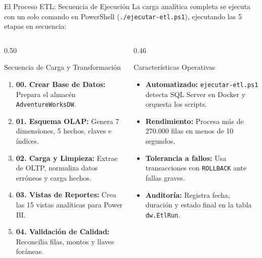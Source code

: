\documentclass[aspectratio=169, 10pt]{beamer}
\begin{document}
\begin{frame}{El Proceso ETL: Secuencia de Ejecución}
    La carga analítica completa se ejecuta con un solo comando en PowerShell (\texttt{./ejecutar-etl.ps1}), ejecutando las 5 etapas en secuencia:
    
    \vspace{0.2cm}
    \begin{columns}[t]
        \begin{column}{0.50\textwidth}
            \begin{block}{Secuencia de Carga y Transformación}
                \footnotesize
                \begin{enumerate}\setlength{\itemsep}{2.5pt}
                    \item \textbf{00. Crear Base de Datos:} Prepara el almacén \texttt{AdventureWorksDW}.
                    \item \textbf{01. Esquema OLAP:} Genera 7 dimensiones, 5 hechos, claves e índices.
                    \item \textbf{02. Carga y Limpieza:} Extrae de OLTP, normaliza datos erróneos y carga hechos.
                    \item \textbf{03. Vistas de Reportes:} Crea las 15 vistas analíticas para Power BI.
                    \item \textbf{04. Validación de Calidad:} Reconcilia filas, montos y llaves foráneas.
                \end{enumerate}
            \end{block}
        \end{column}
        
        \begin{column}{0.46\textwidth}
            \begin{exampleblock}{Características Operativas}
                \footnotesize
                \begin{itemize}\setlength{\itemsep}{2.5pt}
                    \item \textbf{Automatizado:} \texttt{ejecutar-etl.ps1} detecta SQL Server en Docker y orquesta los scripts.
                    \item \textbf{Rendimiento:} Procesa más de 270.000 filas en menos de 10 segundos.
                    \item \textbf{Tolerancia a fallos:} Usa transacciones con \texttt{ROLLBACK} ante fallas graves.
                    \item \textbf{Auditoría:} Registra fecha, duración y estado final en la tabla \texttt{dw.EtlRun}.
                \end{itemize}
            \end{exampleblock}
        \end{column}
    \end{columns}
\end{frame}
\end{document}
